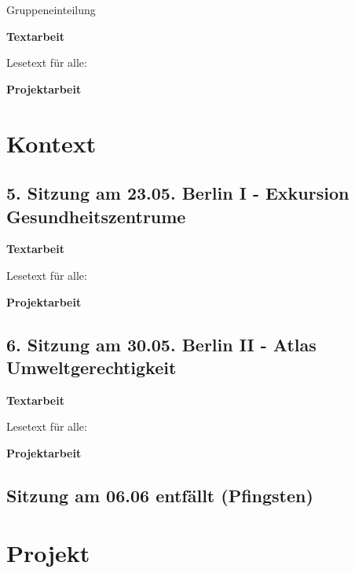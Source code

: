 \documentclass[
  ngerman,
]{article}
\begin{document}
Gruppeneinteilung

\textbf{Textarbeit}

Lesetext für alle:

\textbf{Projektarbeit}

\hypertarget{kontext}{%
\section*{Kontext}\label{kontext}}

\hypertarget{sitzung-am-23.05.-berlin-i---exkursion-gesundheitszentrume}{%
\subsection*{5. Sitzung am 23.05. \textbar{} Berlin I - Exkursion Gesundheitszentrume}\label{sitzung-am-23.05.-berlin-i---exkursion-gesundheitszentrume}}

\textbf{Textarbeit}

Lesetext für alle:

\textbf{Projektarbeit}

\hypertarget{sitzung-am-30.05.-berlin-ii---atlas-umweltgerechtigkeit}{%
\subsection*{6. Sitzung am 30.05. \textbar{} Berlin II - Atlas Umweltgerechtigkeit}\label{sitzung-am-30.05.-berlin-ii---atlas-umweltgerechtigkeit}}

\textbf{Textarbeit}

Lesetext für alle:

\textbf{Projektarbeit}

\hypertarget{sitzung-am-06.06-entfuxe4llt-pfingsten}{%
\subsection*{Sitzung am 06.06 entfällt (Pfingsten)}\label{sitzung-am-06.06-entfuxe4llt-pfingsten}}

\hypertarget{projekt}{%
\section*{Projekt}\label{projekt}}
\end{document}
